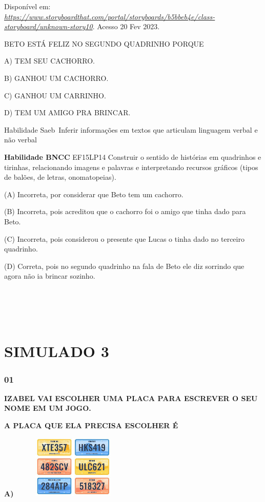 Disponível em:
\href{https://www.storyboardthat.com/portal/storyboards/b5bbeb4e/class-storyboard/unknown-story10}{\emph{https://www.storyboardthat.com/portal/storyboards/b5bbeb4e/class-storyboard/unknown-story10}}.
Acesso 20 Fev 2023.

BETO ESTÁ FELIZ NO SEGUNDO QUADRINHO PORQUE

A) TEM SEU CACHORRO.

B) GANHOU UM CACHORRO.

C) GANHOU UM CARRINHO.

D) TEM UM AMIGO PRA BRINCAR.

Habilidade Saeb~Inferir informações em textos que articulam linguagem
verbal e não verbal

\textbf{Habilidade BNCC} EF15LP14 Construir o sentido de histórias em
quadrinhos e tirinhas, relacionando imagens e palavras e interpretando
recursos gráficos (tipos de balões, de letras, onomatopeias).

(A) Incorreta, por considerar que Beto tem um cachorro.

(B) Incorreta, pois acreditou que o cachorro foi o amigo que tinha dado
para Beto.

(C) Incorreta, pois considerou o presente que Lucas o tinha dado no
terceiro quadrinho.

(D) Correta, pois no segundo quadrinho na fala de Beto ele diz sorrindo
que agora não ia brincar sozinho.

\protect\hypertarget{_heading=h.1mrcu09}{}{}

\section{\texorpdfstring{\\
}{ }}\label{section-56}

\section{SIMULADO 3}\label{simulado-3}

\subsubsection{01}\label{section-57}

\textbf{IZABEL VAI ESCOLHER UMA PLACA PARA ESCREVER O SEU NOME EM UM
JOGO.}

\textbf{A PLACA QUE ELA PRECISA ESCOLHER É }

\textbf{A)}
\includegraphics[width=2.32569in,height=1.18472in]{media/image222.jpg}

